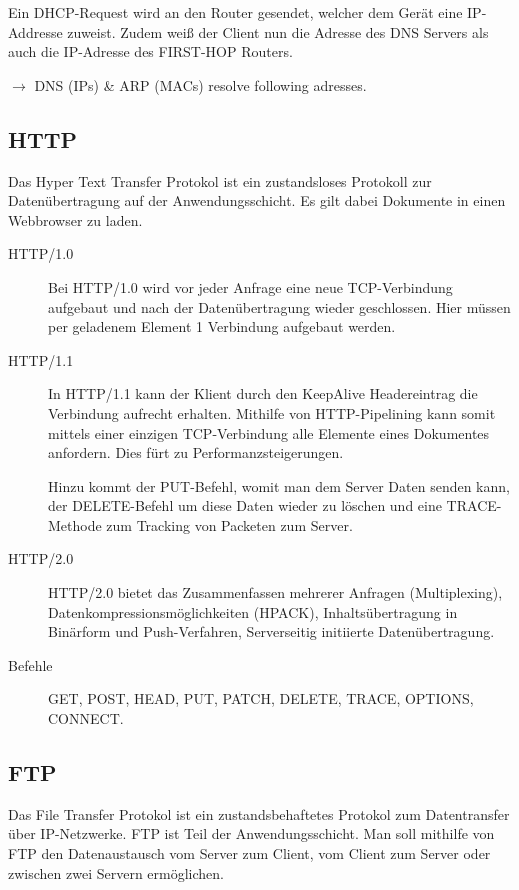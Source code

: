 \documentclass{scrartcl}
\begin{document}
    Ein DHCP-Request wird an den Router gesendet, welcher dem Gerät eine IP-Addresse zuweist. 
    Zudem weiß der Client nun die Adresse des DNS Servers als auch die IP-Adresse des FIRST-HOP Routers.
    
    $\rightarrow$ DNS (IPs) \& ARP (MACs) resolve following adresses.
    
    \subsection{HTTP}
    \label{subsection:protocols_http}
    Das Hyper Text Transfer Protokol ist ein zustandsloses Protokoll zur Datenübertragung auf der Anwendungsschicht. 
    Es gilt dabei Dokumente in einen Webbrowser zu laden.
    \begin{description}
        \item [HTTP/1.0] Bei HTTP/1.0 wird vor jeder Anfrage eine neue TCP-Verbindung aufgebaut und nach der Datenübertragung wieder geschlossen. Hier müssen per geladenem Element 1 Verbindung aufgebaut werden.
        \item [HTTP/1.1] In HTTP/1.1 kann der Klient durch den KeepAlive Headereintrag die Verbindung aufrecht erhalten. Mithilfe von HTTP-Pipelining kann somit mittels einer einzigen TCP-Verbindung alle Elemente eines Dokumentes anfordern. Dies fürt zu Performanzsteigerungen.
        
        Hinzu kommt der PUT-Befehl, womit man dem Server Daten senden kann, der DELETE-Befehl um diese Daten wieder zu löschen und eine TRACE-Methode zum Tracking von Packeten zum Server. 
        \item [HTTP/2.0] HTTP/2.0 bietet das Zusammenfassen mehrerer Anfragen (Multiplexing), Datenkompressionsmöglichkeiten (HPACK), Inhaltsübertragung in Binärform und Push-Verfahren, Serverseitig initiierte Datenübertragung.
        \item [Befehle] GET, POST, HEAD, PUT, PATCH, DELETE, TRACE, OPTIONS, CONNECT.
    \end{description}
    
    
    \subsection{FTP}
    \label{subsection:protocols_ftp}
    Das File Transfer Protokol ist ein zustandsbehaftetes Protokol zum Datentransfer über IP-Netzwerke. 
    FTP ist Teil der Anwendungsschicht.
    Man soll mithilfe von FTP den Datenaustausch vom Server zum Client, 
    vom Client zum Server oder zwischen zwei Servern ermöglichen.
    
\end{document}
